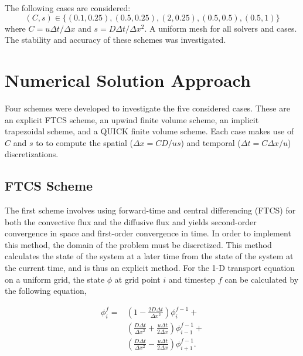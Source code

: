 \documentclass[twocolumn,10pt]{asme2ej}
\begin{document}
The following cases are considered:
\begin{equation*}
(C, s) \in \{(0.1, 0.25), (0.5, 0.25), (2, 0.25), (0.5, 0.5), (0.5, 1)\}
\end{equation*}
\noindent where $C = u\Delta t/\Delta x$ and $s = D\Delta t/\Delta x^2$. A uniform mesh for all solvers and cases. The stability and accuracy of these schemes was investigated.

\section{Numerical Solution Approach}

Four schemes were developed to investigate the five considered cases. These are an explicit FTCS scheme, an upwind finite volume scheme, an implicit trapezoidal scheme, and a QUICK finite volume scheme. Each case makes use of $C$ and $s$ to to compute the spatial ($\Delta x = C D / u s$) and temporal ($\Delta t = C \Delta x / u$) discretizations.

\subsection{FTCS Scheme}
The first scheme involves using forward-time and central differencing (FTCS) for both the convective flux and the diffusive flux and yields second-order convergence in space and first-order convergence in time. In order to implement this method, the domain of the problem must be discretized. This method calculates the state of the system at a later time from the state of the system at the current time, and is thus an explicit method. For the 1-D transport equation on a uniform grid, the state $\phi$ at grid point $i$ and timestep $f$ can be calculated by the following equation,

\begin{equation}
\label{ftcs_eqn}
\begin{split}
\phi_i ^f = & \left(1-\frac{2 D\Delta t}{\Delta x^2}\right) \phi_i ^{f-1} + \\
            & \left(\frac{D \Delta t}{\Delta x^2} + \frac{u \Delta t}{2 \Delta x}\right) \phi_{i-1} ^{f-1} + \\
            & \left(\frac{D \Delta t}{\Delta x^2} - \frac{u \Delta t}{2 \Delta x}\right) \phi_{i+1} ^{f-1}.
\end{split}
\end{equation}
\end{document}
